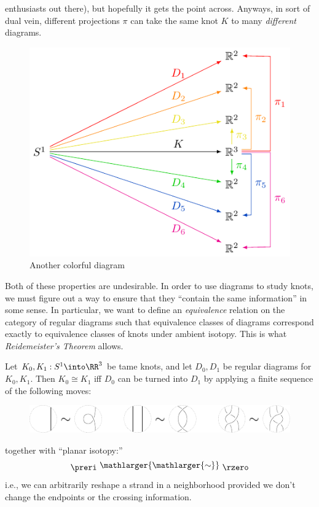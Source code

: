 \begin{remark}
  enthusiasts out there), but hopefully it gets the point across.
  Anyways, in sort of dual vein, different projections $\pi$ can take
  the same knot $K$ to many \emph{different} diagrams.
  \begin{figure}[H]
    \centering
    \includegraphics{figures/background/multiD_comm_diag.pdf}
    \caption{Another colorful diagram}
  \end{figure}
\end{remark}
Both of these properties are undesirable. In order to use diagrams to
study knots, we must figure out a way to ensure that they ``contain
the same information'' in some sense. In particular, we want to define
an \emph{equivalence} relation on the category of regular diagrams
such that equivalence classes of diagrams correspond exactly to
equivalence classes of knots under ambient isotopy. This is what
\emph{Reidemeister's Theorem} allows.
\begin{theorem}[Reidemeister, 1927]
  Let $K_0, K_1 : S^1\into \RR^3$ be tame knots, and let $D_0, D_1$ be
  regular diagrams for $K_0, K_1$. Then $K_0 \cong K_1$ iff $D_0$ can
  be turned into $D_1$ by applying a finite sequence of the following
  moves:
  \begin{figure}[H]
    \centering
    \includegraphics[scale=1.5]{figures/intro/rmoves.pdf}
  \end{figure}
  \noindent together with ``planar isotopy:''
  \[
    \preri
    \ \raisebox{.25em}{$\mathlarger{\mathlarger{\sim}}$}\ \rzero
  \]
  i.e., we can arbitrarily reshape a strand in a neighborhood provided
  we don't change the endpoints or the crossing information.
\end{theorem}
